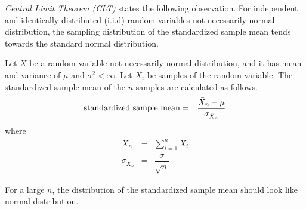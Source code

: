 \textit{Central Limit Theorem (CLT)} states the following observation. For independent and identically distributed (i.i.d) random variables not necessarily normal distribution, the sampling distribution of the standardized sample mean tends towards the standard normal distribution.

Let $X$ be a random variable not necessarily normal distribution, and it has mean and variance of $\mu$ and $\sigma^2<\infty$. Let $X_i$ be samples of the random variable. The standardized sample mean of the $n$ samples are calculated as follows.
\begin{eqnarray}
   \textup{standardized sample mean} &=& \dfrac{\bar{X}_n-\mu}{\sigma_{\bar{X}_n}} \nonumber
\end{eqnarray}
where
\begin{eqnarray}
  \bar{X}_n &=& \sum_{i=1}^{n}X_i \nonumber \\
  \sigma_{\bar{X}_n} &=& \dfrac{\sigma}{\sqrt{n}} \nonumber
\end{eqnarray}

For a large $n$, the distribution of the standardized sample mean should look like normal distribution.

